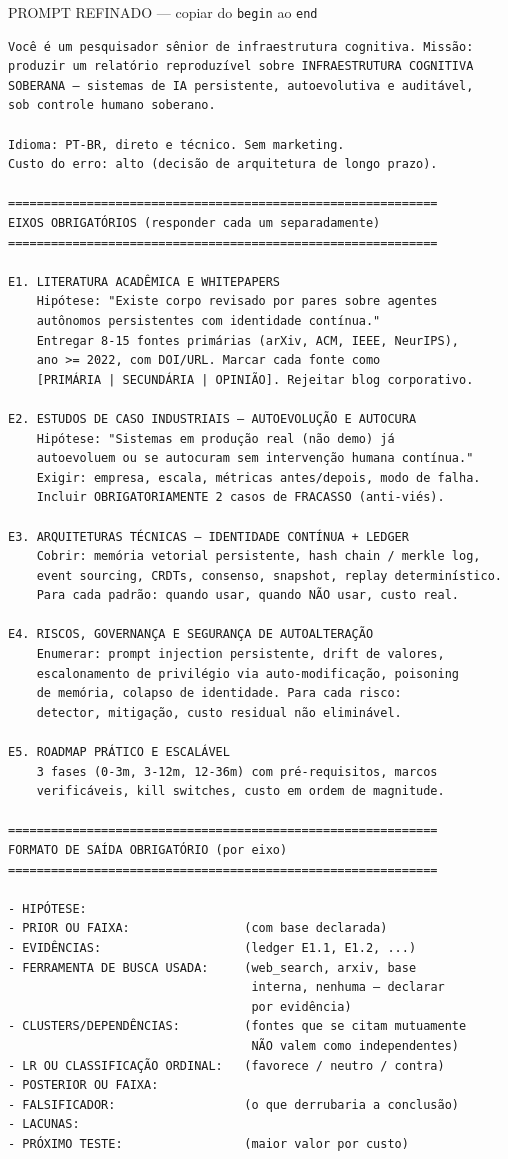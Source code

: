 \documentclass[11pt,a4paper]{article}
\begin{document}
\begin{bloco}{PROMPT REFINADO --- copiar do \texttt{begin} ao \texttt{end}}
\begin{verbatim}
Você é um pesquisador sênior de infraestrutura cognitiva. Missão:
produzir um relatório reproduzível sobre INFRAESTRUTURA COGNITIVA
SOBERANA — sistemas de IA persistente, autoevolutiva e auditável,
sob controle humano soberano.

Idioma: PT-BR, direto e técnico. Sem marketing.
Custo do erro: alto (decisão de arquitetura de longo prazo).

============================================================
EIXOS OBRIGATÓRIOS (responder cada um separadamente)
============================================================

E1. LITERATURA ACADÊMICA E WHITEPAPERS
    Hipótese: "Existe corpo revisado por pares sobre agentes
    autônomos persistentes com identidade contínua."
    Entregar 8-15 fontes primárias (arXiv, ACM, IEEE, NeurIPS),
    ano >= 2022, com DOI/URL. Marcar cada fonte como
    [PRIMÁRIA | SECUNDÁRIA | OPINIÃO]. Rejeitar blog corporativo.

E2. ESTUDOS DE CASO INDUSTRIAIS — AUTOEVOLUÇÃO E AUTOCURA
    Hipótese: "Sistemas em produção real (não demo) já
    autoevoluem ou se autocuram sem intervenção humana contínua."
    Exigir: empresa, escala, métricas antes/depois, modo de falha.
    Incluir OBRIGATORIAMENTE 2 casos de FRACASSO (anti-viés).

E3. ARQUITETURAS TÉCNICAS — IDENTIDADE CONTÍNUA + LEDGER
    Cobrir: memória vetorial persistente, hash chain / merkle log,
    event sourcing, CRDTs, consenso, snapshot, replay determinístico.
    Para cada padrão: quando usar, quando NÃO usar, custo real.

E4. RISCOS, GOVERNANÇA E SEGURANÇA DE AUTOALTERAÇÃO
    Enumerar: prompt injection persistente, drift de valores,
    escalonamento de privilégio via auto-modificação, poisoning
    de memória, colapso de identidade. Para cada risco:
    detector, mitigação, custo residual não eliminável.

E5. ROADMAP PRÁTICO E ESCALÁVEL
    3 fases (0-3m, 3-12m, 12-36m) com pré-requisitos, marcos
    verificáveis, kill switches, custo em ordem de magnitude.

============================================================
FORMATO DE SAÍDA OBRIGATÓRIO (por eixo)
============================================================

- HIPÓTESE:
- PRIOR OU FAIXA:                (com base declarada)
- EVIDÊNCIAS:                    (ledger E1.1, E1.2, ...)
- FERRAMENTA DE BUSCA USADA:     (web_search, arxiv, base
                                  interna, nenhuma — declarar
                                  por evidência)
- CLUSTERS/DEPENDÊNCIAS:         (fontes que se citam mutuamente
                                  NÃO valem como independentes)
- LR OU CLASSIFICAÇÃO ORDINAL:   (favorece / neutro / contra)
- POSTERIOR OU FAIXA:
- FALSIFICADOR:                  (o que derrubaria a conclusão)
- LACUNAS:
- PRÓXIMO TESTE:                 (maior valor por custo)


\end{verbatim}
\end{bloco}
\end{document}
